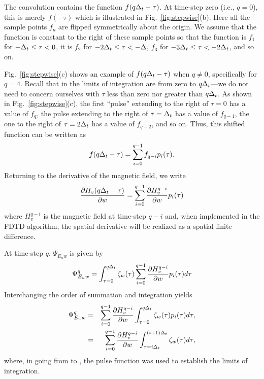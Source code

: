 The convolution contains the function $f(q\Delta_t-\tau)$.  At time-step
zero (i.e., $q=0$), this is merely $f(-\tau)$ which is illustrated in
Fig.\ \ref{fig:stepwise}(b).  Here all the sample points $f_n$ are
flipped symmetrically about the origin.  We assume that the function
is constant to the right of these sample points so that the function
is $f_1$ for $-\Delta_t\leq\tau<0$, it is $f_2$ for
$-2\Delta_t\leq\tau<-\Delta$, $f_3$ for $-3\Delta_t\leq\tau<-2\Delta_t$, and so
on.

Fig.\ \ref{fig:stepwise}(c) shows an example of $f(q\Delta_t-\tau)$ when
$q\neq 0$, specifically for $q=4$.  Recall that in
 the limits of integration are from zero to
$q\Delta_t$---we do not need to concern ourselves with $\tau$ less than
zero nor greater than $q\Delta_t$.  As shown in Fig.\
\ref{fig:stepwise}(c), the first ``pulse'' extending to the right of
$\tau=0$ has a value of $f_q$, the pulse extending to the right of
$\tau=\Delta_t$ has a value of $f_{q-1}$, the one to the right of
$\tau=2\Delta_t$ has a value of $f_{q-2}$, and so on.  Thus, this shifted
function can be written as
\begin{equation}
  f(q\Delta_t-\tau) = \sum_{i=0}^{q-1}f_{q-i}p_i(\tau).
\end{equation}
Returning to the derivative of the magnetic field, we write
\begin{equation}
  \frac{\partial H_v(q\Delta_t-\tau)}{\partial w} = 
  \sum_{i=0}^{q-1}\frac{\partial H_v^{q-i}}{\partial w}p_i(\tau)
\end{equation}
where $H_v^{q-i}$ is the magnetic field at time-step $q-i$ and, when
implemented in the FDTD algorithm, the spatial derivative will be
realized as a spatial finite difference.

At time-step $q$, $\Psi_{E_uw}$ is given by
\begin{equation}
  \Psi_{E_uw}^q =
  \int_{\tau=0}^{q\Delta_t} \zeta_w(\tau) 
   \sum_{i=0}^{q-1} \frac{\partial H_v^{q-i}}{\partial w}p_i(\tau) d\tau
\end{equation}
Interchanging the order of summation and integration yields
\begin{eqnarray}
  \Psi_{E_uw}^q &=&
     \sum_{i=0}^{q-1} \frac{\partial H_v^{q-i}}{\partial w}
     \int_{\tau=0}^{q\Delta_t} \zeta_w(\tau)p_i(\tau) d\tau, 
     \label{eq:psiIntOne}
  \\
   &=&
     \sum_{i=0}^{q-1} \frac{\partial H_v^{q-i}}{\partial w}
     \int_{\tau=i\Delta_t}^{(i+1)\Delta_t} \zeta_w(\tau) d\tau,
     \label{eq:psiIntTwo}
\end{eqnarray}
where, in going from  to , the
pulse function was used to establish the limits of integration.

